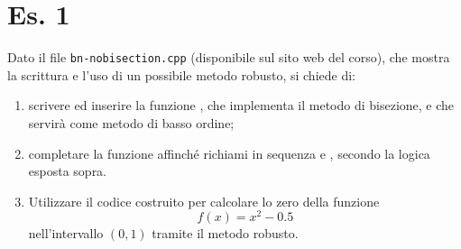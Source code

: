 \section*{Es. 1}

Dato il file \texttt{bn-nobisection.cpp} (disponibile sul sito web del corso),
che mostra la scrittura e l'uso di un possibile metodo robusto, si chiede di:
\begin{enumerate}

    \item scrivere ed inserire la funzione ,
        che implementa il metodo di bisezione, e che servir\`a come metodo di basso ordine;

    \item completare la funzione  affinch\'e richiami in sequenza
         e , secondo la logica esposta sopra.

    \item Utilizzare il codice costruito per calcolare lo zero della
       funzione
       \begin{equation*}
         f(x) = x^2 - 0.5
       \end{equation*}
       nell'intervallo $(0, 1)$ tramite il metodo robusto.

\end{enumerate}
